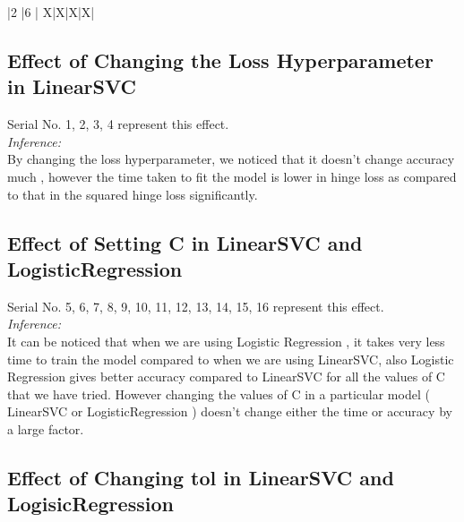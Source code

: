 \documentclass[11 pt]{article}
\begin{document}
{\begin{table}[h]
\begin{flushleft}
\begin{tabularx}{\textwidth}{|2 |6 | X|X|X|X|}
        \bottomrule
    \end{tabularx}
    \end{flushleft}
    \caption{Model performance on different settings; All time in sec}
    \label{tab:my_table}
\end{table}
\subsection{Effect of Changing the Loss Hyperparameter in LinearSVC}


\vspace{0.33 cm} 

Serial No. 1, 2, 3, 4 represent this effect. 
\\
\emph{Inference: }
\\
By changing the loss hyperparameter, we noticed that it doesn't change accuracy much , however the time taken to fit the model is lower in hinge loss as compared to that in the squared hinge loss significantly.

\vspace{0.33 cm}

\subsection{Effect of Setting C in LinearSVC and LogisticRegression }


\vspace{0.33 cm} 

Serial No. 5, 6, 7, 8, 9, 10, 11, 12, 13, 14, 15, 16  represent this effect. 
\\
\emph{Inference: }
\\
It can be noticed that when we are using Logistic Regression , it takes very less time to train the model compared to when we are using LinearSVC, also Logistic Regression gives better accuracy compared to LinearSVC for all the values of C that we have tried. However changing the values of C in a particular model ( LinearSVC or LogisticRegression ) doesn't change either the time or accuracy by a large factor.


\vspace{0.33 cm}

\subsection{Effect of Changing tol in LinearSVC and LogisicRegression}


\vspace{0.33 cm} 

}
\end{document}
